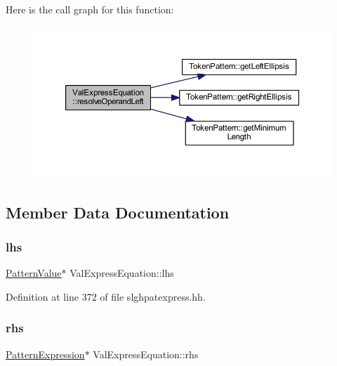 Here is the call graph for this function\+:
\nopagebreak
\begin{figure}[H]
\begin{center}
\leavevmode
\includegraphics[width=350pt]{class_val_express_equation_ad13fa9a79e7ff80ed63b0c0e12f395ab_cgraph}
\end{center}
\end{figure}


\subsection{Member Data Documentation}
\mbox{\label{class_val_express_equation_ae2af03dbcb100d38b6aa7b29bf6c5f70}} 
\subsubsection{\texorpdfstring{lhs}{lhs}}
{\footnotesize\ttfamily \mbox{\hyperlink{class_pattern_value}{Pattern\+Value}}$\ast$ Val\+Express\+Equation\+::lhs\hspace{0.3cm}{\ttfamily [protected]}}



Definition at line 372 of file slghpatexpress.\+hh.

\mbox{\label{class_val_express_equation_a973fad1537c954afff3af4d170019e6e}} 
\subsubsection{\texorpdfstring{rhs}{rhs}}
{\footnotesize\ttfamily \mbox{\hyperlink{class_pattern_expression}{Pattern\+Expression}}$\ast$ Val\+Express\+Equation\+::rhs\hspace{0.3cm}{\ttfamily [protected]}}



